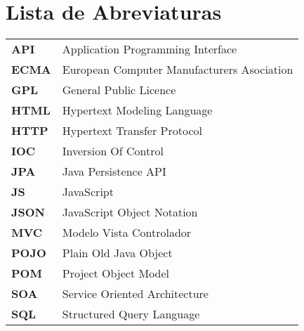 \chapter*{Lista de Abreviaturas}
\begin{table*}[h!]
    \begin{center}
        \begin{tabular}{ll}
            \textbf{API} & Application Programming Interface\\
            \textbf{ECMA} & European Computer Manufacturers Asociation\\
            \textbf{GPL} & General Public Licence\\
            \textbf{HTML} & Hypertext Modeling Language\\
            \textbf{HTTP} & Hypertext Transfer Protocol\\
            \textbf{IOC} & Inversion Of Control\\
            \textbf{JPA} & Java Persistence API\\
            \textbf{JS} & JavaScript\\
            \textbf{JSON} & JavaScript Object Notation\\
            \textbf{MVC} & Modelo Vista Controlador\\
            \textbf{POJO} & Plain Old Java Object\\
            \textbf{POM} & Project Object Model\\
            \textbf{SOA} & Service Oriented Architecture\\
            \textbf{SQL} & Structured Query Language\\
        \end{tabular}
    \end{center}
\end{table*}